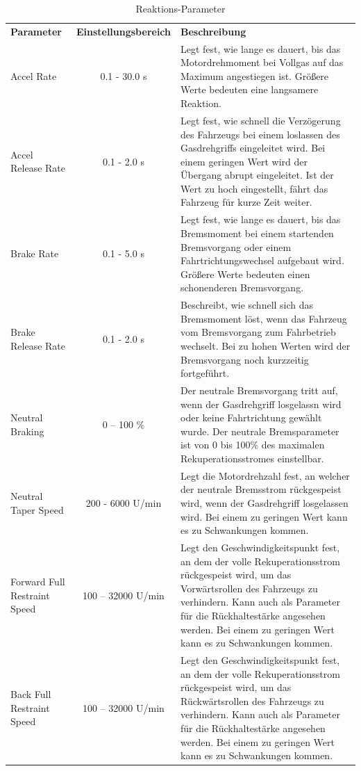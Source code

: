 \setlength{\tabcolsep}{6pt}
\begin{table}[H]
	\begin{tabular}{|p{2.5cm}cp{8cm}|}\hline
	\rowcolor[gray]{0.8}\textbf{Parameter} & \textbf{Einstellungsbereich} &\textbf{Beschreibung}\\[2pt]
		Accel Rate 						& 0.1 - 30.0 s 		& Legt fest, wie lange es dauert, bis das Motordrehmoment bei Vollgas auf das Maximum angestiegen ist. Größere Werte bedeuten eine langsamere Reaktion. \\\hline
		Accel Release Rate				& 0.1 - 2.0 s 	 	&  Legt fest, wie schnell die Verzögerung des Fahrzeugs bei einem loslassen des Gasdrehgriffs eingeleitet wird. Bei einem geringen Wert wird der Übergang abrupt eingeleitet. Ist der Wert zu hoch eingestellt, fährt das Fahrzeug für kurze Zeit weiter.\\\hline
		Brake Rate 						& 0.1 - 5.0 s 	 	& Legt fest, wie lange es dauert, bis das Bremsmoment bei einem startenden Bremsvorgang oder einem Fahrtrichtungswechsel aufgebaut wird. Größere Werte bedeuten einen schonenderen Bremsvorgang. \\\hline
		Brake Release Rate				& 0.1 - 2.0 s 	 	& Beschreibt, wie schnell sich das Bremsmoment löst, wenn das Fahrzeug vom Bremsvorgang zum Fahrbetrieb wechselt. Bei zu hohen Werten wird der Bremsvorgang noch kurzzeitig fortgeführt.  \\\hline
		Neutral Braking    				& 0 – 100 \% 		& Der neutrale Bremsvorgang tritt auf, wenn der Gasdrehgriff losgelassn wird oder keine Fahrtrichtung gewählt wurde. Der neutrale Bremsparameter ist von 0 bis 100\% des maximalen Rekuperationsstromes einstellbar. \\\hline
		Neutral Taper Speed    			& 200 - 6000 U/min 	& Legt die Motordrehzahl fest, an welcher der neutrale Bremsstrom rückgespeist wird, wenn der Gasdrehgriff losgelassen wird. Bei einem zu geringen Wert kann es zu Schwankungen kommen.\\\hline
		Forward Full Restraint Speed	& 100 – 32000 U/min & Legt den Geschwindigkeitspunkt fest, an dem der volle Rekuperationsstrom rückgespeist wird, um das Vorwärtsrollen des Fahrzeugs zu verhindern. Kann auch als Parameter für die Rückhaltestärke angesehen werden. Bei einem zu geringen Wert kann es zu Schwankungen kommen.  \\\hline
		Back Full Restraint Speed    	& 100 – 32000 U/min & Legt den Geschwindigkeitspunkt fest, an dem der volle Rekuperationsstrom rückgespeist wird, um das Rückwärtsrollen des Fahrzeugs zu verhindern. Kann auch als Parameter für die Rückhaltestärke angesehen werden. Bei einem zu geringen Wert kann es zu Schwankungen kommen. \\\hline		
	\end{tabular}	
	\caption{Reaktions-Parameter}
	\label{tab:Reaktions-Parameter}
\end{table}


